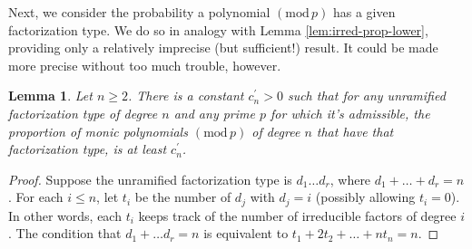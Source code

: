 \documentclass[12pt]{amsart}
\newtheorem{lemma}[theorem]{Lemma}
\theoremstyle{definition} \newtheorem*{notation}{Notation}
\theoremstyle{remark} \newtheorem*{remark}{Remark}
\theoremstyle{remark} \newtheorem*{example}{Example}
\theoremstyle{definition} \newtheorem*{definition}{Definition}
\numberwithin{equation}{section}
\numberwithin{theorem}{section}
\renewcommand{\pmod}[1]{\left(\mathrm{mod}\,#1\right)}
\begin{document}
	Next, we consider the probability a polynomial $\pmod{p}$ has a given factorization type.  We do so in analogy with Lemma \ref{lem:irred-prop-lower}, providing only a relatively imprecise (but sufficient!) result.  It could be made more precise without too much trouble, however.
	
	\begin{lemma}\label{lem:factor-prop}
		Let $n \geq 2$.  There is a constant $c_n^\prime > 0$ such that for any unramified factorization type of degree $n$ and any prime $p$ for which it's admissible, the proportion of monic polynomials $\pmod{p}$ of degree $n$ that have that factorization type, is at least $c_n^\prime$.
	\end{lemma}
	\begin{proof}
		Suppose the unramified factorization type is $d_1\dots d_r$, where $d_1 + \dots + d_r = n$.  For each $i \leq n$, let $t_i$ be the number of $d_j$ with $d_j = i$ (possibly allowing $t_i = 0$).  In other words, each $t_i$ keeps track of the number of irreducible factors of degree $i$.  The condition that $d_1 + \dots d_r = n$ is equivalent to $t_1 + 2t_2 + \dots + nt_n = n$.
		

\end{proof}
\end{document}
